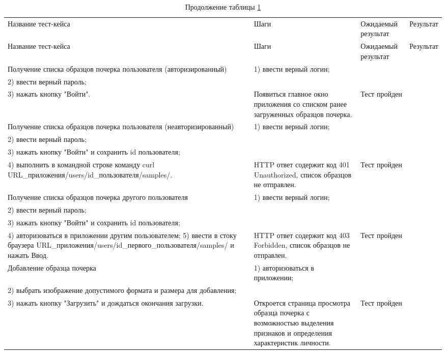 \begin{longtable}{| >{\raggedright}p{}
                  | >{\raggedright}p{}
                  | >{\raggedright}p{}
                  | >{\raggedright\arraybackslash}p{}|}
  \caption{Тестирование операций с образцами почерка}
  \label{table:testing:db}\\
  \endfirsthead
  \caption*{Продолжение таблицы \ref{table:testing:db}}\\
    \hline
       Название тест-кейса & Шаги & Ожидаемый результат & Результат \\
   \hline
  \endhead

  \hline
       Название тест-кейса & Шаги & Ожидаемый результат & Результат \\
   \hline
    Получение списка образцов почерка пользователя (авторизированный) &
    1) ввести верный логин; \\
    2) ввести верный пароль; \\
    3) нажать кнопку "Войти".
    &
    Появиться главное окно приложения со списком ранее загруженных образцов почерка.
    &
    Тест пройден \\ \hline

   Получение списка образцов почерка пользователя (неавторизированный) &
    1) ввести верный логин; \\
    2) ввести верный пароль; \\
    3) нажать кнопку "Войти" и сохранить id пользователя; \\
    4) выполнить в командной строке команду curl URL\_приложения/users/id\_пользователя/samples/.
    &
    HTTP ответ содержит код 401 Unauthorized, список образцов не отправлен.
    &
    Тест пройден \\ \hline

    Получение списка образцов почерка другого пользователя &
    1) ввести верный логин; \\
    2) ввести верный пароль; \\
    3) нажать кнопку "Войти" и сохранить id пользователя; \\
    4) авторизоваться в приложении другим пользователем;
    5) ввести в стоку браузера URL\_приложения/users/id\_первого\_пользователя/samples/ и нажать Ввод.
    &
    HTTP ответ содержит код 403 Forbidden, список образцов не отправлен. 
    &
    Тест пройден \\ \hline

   Добавление образца почерка &
   1) авторизоваться в приложении; \\
   2) выбрать изображение допустимого формата и размера для добавления; \\
   3) нажать кнопку "Загрузить" и дождаться окончания загрузки.
   &
   Откроется страница просмотра образца почерка с возможностью выделения признаков и определения характеристик личности.
   &
   Тест пройден \\ \hline


\end{longtable}
